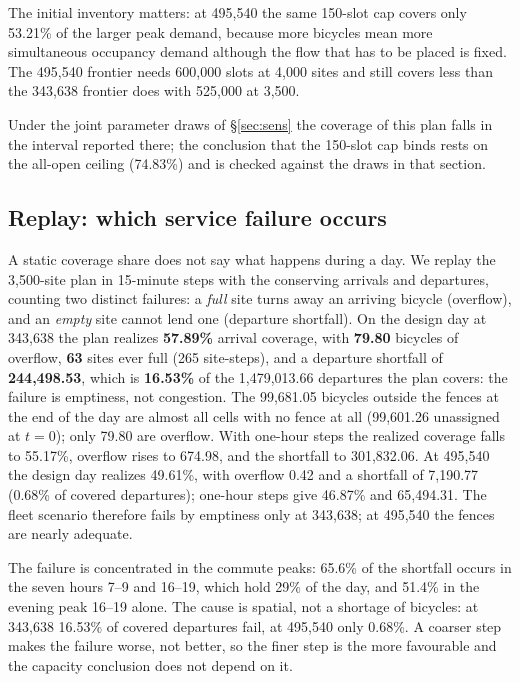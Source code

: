 The initial inventory matters: at 495,540 the same 150-slot cap covers only 53.21\% of
the larger peak demand, because more bicycles mean more simultaneous occupancy demand
although the flow that has to be placed is fixed. The 495,540 frontier needs 600,000
slots at 4,000 sites and still covers less than the 343,638 frontier does with 525,000
at 3,500.

Under the joint parameter draws of \S\ref{sec:sens} the coverage of this plan falls in
the interval reported there; the conclusion that the 150-slot cap binds rests on the
all-open ceiling (74.83\%) and is checked against the draws in that section.

\subsection{Replay: which service failure occurs}

A static coverage share does not say what happens during a day. We replay the 3,500-site
plan in 15-minute steps with the conserving arrivals and departures, counting two
distinct failures: a \emph{full} site turns away an arriving bicycle (overflow), and an
\emph{empty} site cannot lend one (departure shortfall). On the design day at 343,638
the plan realizes \textbf{57.89\%} arrival coverage, with \textbf{79.80} bicycles of
overflow, \textbf{63} sites ever full (265 site-steps), and a departure shortfall of
\textbf{244,498.53}, which is \textbf{16.53\%} of the 1,479,013.66 departures the plan
covers: the failure is emptiness, not congestion. The 99,681.05 bicycles outside the
fences at the end of the day are almost all cells with no fence at all (99,601.26
unassigned at $t=0$); only 79.80 are overflow. With one-hour steps the realized coverage
falls to 55.17\%, overflow rises to 674.98, and the shortfall to 301,832.06. At 495,540
the design day realizes 49.61\%, with overflow 0.42 and a shortfall of 7,190.77
(0.68\% of covered departures); one-hour steps give 46.87\% and 65,494.31. The fleet
scenario therefore fails by emptiness only at 343,638; at 495,540 the fences are nearly
adequate.

The failure is concentrated in the commute peaks: 65.6\% of the shortfall occurs in the
seven hours 7--9 and 16--19, which hold 29\% of the day, and 51.4\% in the evening peak
16--19 alone. The cause is spatial, not a shortage of bicycles: at 343,638 16.53\% of
covered departures fail, at 495,540 only 0.68\%. A coarser step makes the failure worse,
not better, so the finer step is the more favourable and the capacity conclusion does not
depend on it.

